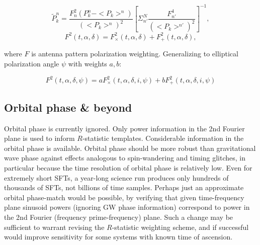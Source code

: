\begin{equation}
\tilde{P}_{k}^{n}=\frac{F_{n}^{2}(P_{k}^{n}-<P_{k}>^{n})}{(<P_{k}>^{n})^{2}}\left[\Sigma_{n'}^{N}\frac{F_{n'}^{4}}{(<P_{k}>^{n'})^{2}}\right]^{-1},
\label{TwoSpect_pixel_powers}
\end{equation}
\begin{equation}
F^{2}(t,\alpha,\delta)=F_{\times}^{2}(t,\alpha,\delta)+F_{+}^{2}(t,\alpha,\delta),
\label{TwoSpect_pol_powers}
\end{equation}

\noindent where $F$ is antenna pattern polarization weighting.
Generalizing to elliptical polarization angle $\psi$ with weights $a,b$:

\begin{equation}
F^{2}(t,\alpha,\delta,\psi)=aF_{\times}^{2}(t,\alpha,\delta,i,\psi)+bF_{+}^{2}(t,\alpha,\delta,i,\psi)
\label{TwoSpect_elliptical_pol}
\end{equation}



\subsection{Orbital phase \& beyond}


Orbital phase is currently ignored.
Only power information in the 2nd Fourier plane is used to inform $R$-statistic templates.
Considerable information in the orbital phase is available.
Orbital phase should be more robust than gravitational wave phase against effects analogous to spin-wandering and timing glitches, in particular because the time resolution of orbital phase is relatively low.
Even for extremely short SFTs, a year-long science run produces only hundreds of thousands of SFTs, not billions of time samples.
Perhaps just an approximate orbital phase-match would be possible, by verifying that given time-frequency plane sinusoid powers (ignoring GW phase information) correspond to power in the 2nd Fourier (frequency prime-frequency) plane.
Such a change may be sufficient to warrant revising the $R$-statistic weighting scheme, and if successful would improve sensitivity for some systems with known time of ascension.

